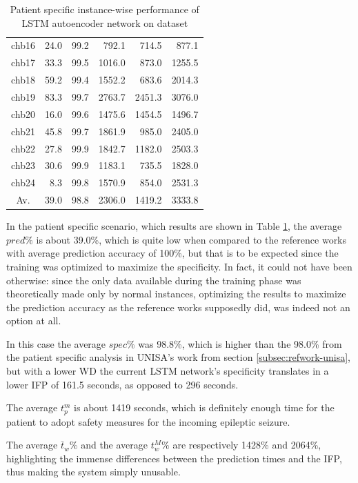 \begin{table}[ht]
\begin{tabular}{c|rrrrr}
    chb16   & 24.0   & 99.2   & 792.1   & 714.5   & 877.1   \\
    chb17   & 33.3   & 99.5   & 1016.0  & 873.0   & 1255.5  \\
    chb18   & 59.2   & 99.4   & 1552.2  & 683.6   & 2014.3  \\
    chb19   & 83.3   & 99.7   & 2763.7  & 2451.3  & 3076.0  \\
    chb20   & 16.0   & 99.6   & 1475.6  & 1454.5  & 1496.7  \\
    chb21   & 45.8   & 99.7   & 1861.9  & 985.0   & 2405.0  \\
    chb22   & 27.8   & 99.9   & 1842.7  & 1182.0  & 2503.3  \\
    chb23   & 30.6   & 99.9   & 1183.1  & 735.5   & 1828.0  \\
    chb24   & 8.3    & 99.8   & 1570.9  & 854.0   & 2531.3  \\ \hline
    Av.     & 39.0   & 98.8   & 2306.0  & 1419.2  & 3333.8  \\ \hline
    \end{tabular}
    \caption{Patient specific instance-wise performance of LSTM autoencoder network on  dataset}
    \label{tab:patient-specific-lstm-instance} 
\end{table}

In the patient specific scenario, which results are shown in Table \ref{tab:patient-specific-lstm-instance}, the average $pred\%$ is about 39.0\%, which is quite low when compared to the reference works with average prediction accuracy of 100\%, but that is to be expected since the training was optimized to maximize the specificity. In fact, it could not have been otherwise: since the only data available during the training phase was theoretically made only by normal instances, optimizing the results to maximize the prediction accuracy as the reference works supposedly did, was indeed not an option at all.

In this case the average $spec\%$ was 98.8\%, which is higher than the 98.0\% from the patient specific analysis in \gls{UNISA}'s work from section \ref{subsec:refwork-unisa}, but with a lower \gls{WD} the current \gls{LSTM} network's specificity translates in a lower \gls{IFP} of 161.5 seconds, as opposed to 296 seconds.

The average $t_p^m$ is about 1419 seconds, which is definitely enough time for the patient to adopt safety measures for the incoming epileptic seizure.

The average $\overline{t}_w\%$ and the average $t_w^M\%$ are respectively 1428\% and 2064\%, highlighting the immense differences between the prediction times and the \gls{IFP}, thus making the system simply unusable.

